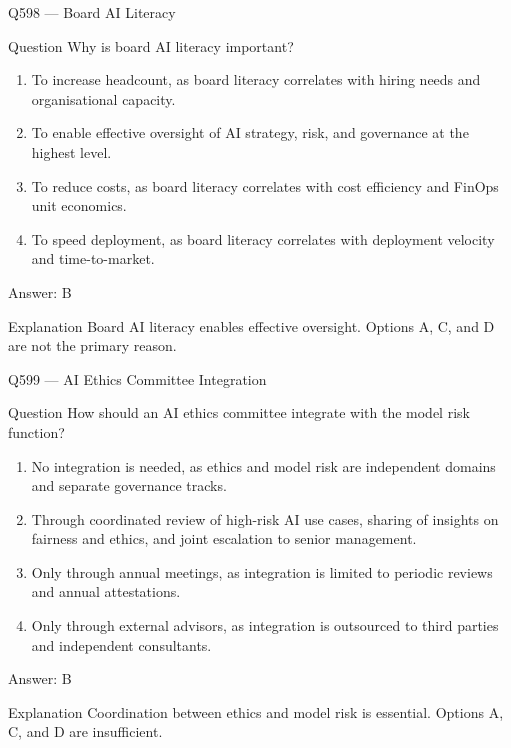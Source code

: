 \documentclass[aspectratio=169,8pt]{beamer}
\begin{document}
	\begin{frame}{Q598 --- Board AI Literacy}
		\begin{block}{Question}
			Why is board AI literacy important?
			\begin{enumerate}
				\item To increase headcount, as board literacy correlates with hiring needs and organisational capacity.
				\item To enable effective oversight of AI strategy, risk, and governance at the highest level.
				\item To reduce costs, as board literacy correlates with cost efficiency and FinOps unit economics.
				\item To speed deployment, as board literacy correlates with deployment velocity and time-to-market.
			\end{enumerate}
		\end{block}
		\begin{exampleblock}{Answer: B}\end{exampleblock}
		\begin{block}{Explanation}
			Board AI literacy enables effective oversight. Options A, C, and D are not the primary reason.
		\end{block}
	\end{frame}
	
	\begin{frame}{Q599 --- AI Ethics Committee Integration}
		\begin{block}{Question}
			How should an AI ethics committee integrate with the model risk function?
			\begin{enumerate}
				\item No integration is needed, as ethics and model risk are independent domains and separate governance tracks.
				\item Through coordinated review of high-risk AI use cases, sharing of insights on fairness and ethics, and joint escalation to senior management.
				\item Only through annual meetings, as integration is limited to periodic reviews and annual attestations.
				\item Only through external advisors, as integration is outsourced to third parties and independent consultants.
			\end{enumerate}
		\end{block}
		\begin{exampleblock}{Answer: B}\end{exampleblock}
		\begin{block}{Explanation}
			Coordination between ethics and model risk is essential. Options A, C, and D are insufficient.
		\end{block}
	\end{frame}
	
\end{document}
